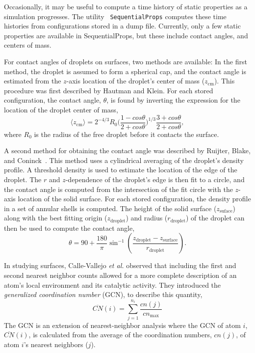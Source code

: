 \documentclass[]{book}
\begin{document}
Occasionally, it may be useful to compute a time history of static
properties as a simulation progresses.  The utility {\tt
  SequentialProps} computes these time histories from configurations
stored in a dump file.  Currently, only a few static properties are
available in SequentialProps, but these include contact angles, and
centers of mass.  

For contact angles of droplets on surfaces, two methods are available:
In the first method, the droplet is assumed to form a spherical cap,
and the contact angle is estimated from the $z$-axis location of the
droplet's center of mass ($z_\mathrm{cm}$).  This procedure was first
described by Hautman and Klein.\cite{Hautman91} For each stored
configuration, the contact angle, $\theta$, is found by inverting the
expression for the location of the droplet center of mass,
\begin{equation}\label{contact_1}
\langle z_\mathrm{cm}\rangle = 2^{-4/3}R_{0}\bigg(\frac{1-cos\theta}{2+cos\theta}\bigg)^{1/3}\frac{3+cos\theta}{2+cos\theta} ,
\end{equation}
where $R_{0}$ is the radius of the free droplet before it contacts the
surface. 

A second method for obtaining the contact angle was described by
Ruijter, Blake, and Coninck~\cite{Ruijter99}.  This method uses a
cylindrical averaging of the droplet's density profile.  A threshold
density is used to estimate the location of the edge of the droplet.
The $r$ and $z$-dependence of the droplet's edge is then fit to a
circle, and the contact angle is computed from the intersection of the
fit circle with the $z$-axis location of the solid surface.  For each
stored configuration, the density profile in a set of annular shells
is computed.  The height of the solid surface ($z_\mathrm{suface}$)
along with the best fitting origin ($z_\mathrm{droplet}$) and radius
($r_\mathrm{droplet}$) of the droplet can then be used to compute the
contact angle,
\begin{equation}
\theta =  90 + \frac{180}{\pi} \sin^{-1}\left(\frac{z_\mathrm{droplet} -
  z_\mathrm{surface}}{r_\mathrm{droplet}} \right).
\end{equation}

In studying surfaces, Calle-Vallejo {\it et al.}  observed that
including the first and second nearest neighbor counts allowed for a
more complete description of an atom's local environment and its
catalytic activity.\cite{Calle-Vallejo:2015qq} They introduced the
\textit{generalized coordination number} (GCN), to describe this
quantity,
\begin{equation}
  \overline{CN}(i) = \sum_{j=1}^{n_i}\frac{cn(j)}{cn_{\textrm{max}}}
  \label{eq:gcn}
\end{equation}
The GCN is an extension of nearest-neighbor analysis where the GCN of
atom $i$, $\overline{CN}(i)$, is calculated from the average of the
coordination numbers, $cn(j)$, of atom $i$'s nearest neighbors ($j$).
\end{document}
